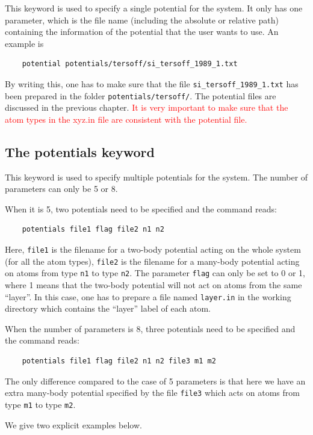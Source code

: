 \documentclass[12pt,a4paper]{report}
\begin{document}
This keyword is used to specify a single potential for the system. It only has one parameter, which is the file name (including the absolute or relative path) containing the information of the potential that the user wants to use. An example is
\begin{verbatim}
    potential potentials/tersoff/si_tersoff_1989_1.txt
\end{verbatim}
By writing this, one has to make sure that the file \verb"si_tersoff_1989_1.txt" has been prepared in the folder \verb"potentials/tersoff/".
The potential files are discussed in the previous chapter. \textcolor{red}{It is very important to make sure that the atom types in the xyz.in file are consistent with the potential file.}

\subsection{The potentials keyword}

This keyword is used to specify multiple potentials for the system. The number of parameters can only be 5 or 8. 

When it is 5, two potentials need to be specified and the command reads:
\begin{verbatim}
    potentials file1 flag file2 n1 n2
\end{verbatim}
Here, \verb"file1" is the filename for a two-body potential acting on the whole system (for all the atom types), \verb"file2" is the filename for a many-body potential acting on atoms from type \verb"n1" to type \verb"n2". The parameter \verb"flag" can only be set to 0 or 1, where 1 means that the two-body potential will not act on atoms from the same ``layer''. In this case, one has to prepare a file named \verb"layer.in" in the working directory which contains the ``layer'' label of each atom.

When the number of parameters is 8, three potentials need to be specified and the command reads:
\begin{verbatim}
    potentials file1 flag file2 n1 n2 file3 m1 m2
\end{verbatim}
The only difference compared to the case of 5 parameters is that here we have an extra many-body potential specified by the file \verb"file3" which acts on atoms from type \verb"m1" to type \verb"m2".

We give two explicit examples below.
\end{document}
